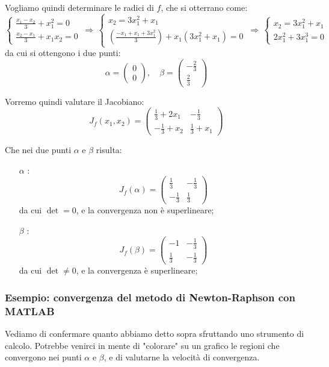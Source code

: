 \documentclass[a4paper,11pt]{article}
\begin{document}
Vogliamo quindi determinare le radici di $f$, che si otterrano come:
\[
	\begin{cases}
		\frac{x_1 - x_2}{3} + x_1^2 = 0 \\
		\frac{x_2 - x_1}{3} + x_1 x_2 = 0
	\end{cases}
	\, \Rightarrow \,
	\begin{cases}
		x_2 = 3 x_1^2 + x_1 \\
		\left( \frac{- x_1 + x_1 + 3 x_1^2}{3} \right) + x_1 (3 x_1^2 + x_1) = 0
	\end{cases}
	\, \Rightarrow \,
	\begin{cases}
		x_2 = 3 x_1^2 + x_1 \\
		2x_1^2 + 3x_1^3 = 0
	\end{cases}
\]
da cui si ottengono i due punti:
$$
\alpha = \begin{pmatrix}
0 \\ 0
\end{pmatrix}, \quad
\beta = \begin{pmatrix}
	-\frac{2}{3} \\ \frac{2}{3}
\end{pmatrix}
$$

\par\smallskip

Vorremo quindi valutare il Jacobiano:
$$
J_f(x_1, x_2) =
\begin{pmatrix}
	\frac{1}{3} + 2 x_1 & -\frac{1}{3} \\
	-\frac{1}{3} + x_2 & \frac{1}{3} + x_1
\end{pmatrix}
$$

Che nei due punti $\alpha$ e $\beta$ risulta:
\begin{itemize}
	\item[$\alpha$]:
		$$
		J_f(\alpha) =
		\begin{pmatrix}
			\frac{1}{3} & -\frac{1}{3} \\ 
			-\frac{1}{3} & \frac{1}{3}
		\end{pmatrix}
		$$
		da cui $\det = 0$, e la convergenza non è superlineare;
	\item[$\beta$]:
		$$
		J_f(\beta) =
		\begin{pmatrix}
			-1 & -\frac{1}{3} \\ 
			\frac{1}{3} & -\frac{1}{3}
		\end{pmatrix}
		$$
		da cui $\det \neq 0$, e la convergenza è superlineare;
\end{itemize}

\subsubsection{Esempio: convergenza del metodo di Newton-Raphson con MATLAB}
Vediamo di confermare quanto abbiamo detto sopra sfruttando uno strumento di calcolo.
Potrebbe venirci in mente di "colorare" su un grafico le regioni che convergono nei punti $\alpha$ e $\beta$, e di valutarne la velocità di convergenza.
\end{document}
